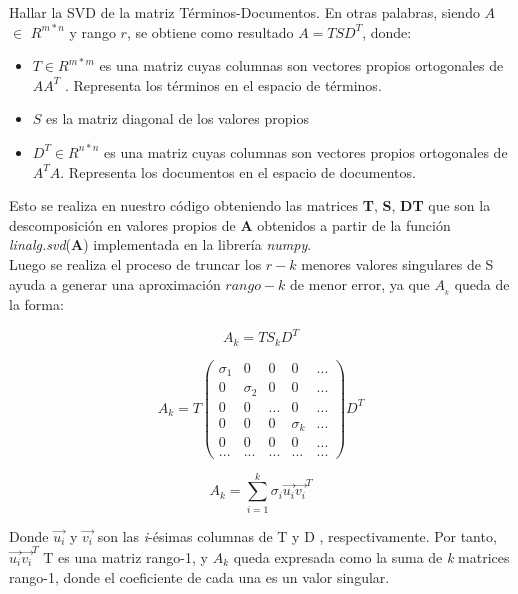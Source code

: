 \documentclass[spanish]{article}
\begin{document}
 Hallar la SVD de la matriz Términos-Documentos. En otras palabras, siendo ${\displaystyle A}$ $ \in $ ${\displaystyle R^{m*n}}$ y rango ${\displaystyle r}$, se obtiene como resultado ${\displaystyle A=TSD^{T}}$, donde:
\begin{itemize}

\item ${\displaystyle T} \in {\displaystyle R^{m*m}}$ es una matriz cuyas columnas son vectores propios ortogonales de $ {\displaystyle AA^{T}}$ . Representa los términos en el espacio de términos.

\item ${\displaystyle S}$ es la matriz diagonal de los valores propios

\item ${\displaystyle D^T} \in {\displaystyle R^{n*n}}$ es una matriz cuyas columnas son vectores propios ortogonales de ${\displaystyle A^{T}A}$. Representa los documentos en el espacio de documentos.
\end{itemize}

Esto se realiza en nuestro código obteniendo las matrices \textbf{T}, \textbf{S}, \textbf{DT} que son la descomposición en valores propios de \textbf{A} obtenidos a partir de la función \emph{linalg.svd}(\textbf{A})
implementada en la librería \emph{numpy}.\\

Luego se realiza el proceso de truncar los $r-k$ menores valores
 singulares de S ayuda a generar una aproximación $rango-k$ de menor error, ya que $A_{_{k}}$ queda de la forma:

$$A_{k}=TS_{k}D^{T}$$

\begin{equation}
A_{k}= T
\begin{pmatrix}
\sigma_{1} & 0 & 0 & 0 & ...\\
0 & \sigma_{2} & 0 & 0 & ...\\
0 & 0 & ... & 0 & ...\\
0 & 0 & 0 & \sigma_{k} & ... \\
0 & 0 & 0 & 0 & ...\\
... & ... & ... & ... & ...
\end{pmatrix}
D^{T}
\end{equation}

$$A_{k}=\sum^{k}_{i=1}\sigma_{i}\vec{u_{i}}\vec{v_{i}}^{T}$$

Donde $\vec{u_{i}}$ y $\vec{v_{i}}$ son las \textit{i}-ésimas columnas de T y D , respectivamente. Por tanto, $\vec{u_{i}}\vec{v_{i}}^{T}$ T es una matriz rango-1, y $A_{k}$ queda expresada como la suma de \textit{k} matrices rango-1, donde el coeficiente de cada una es un valor singular.\\
\end{document}
